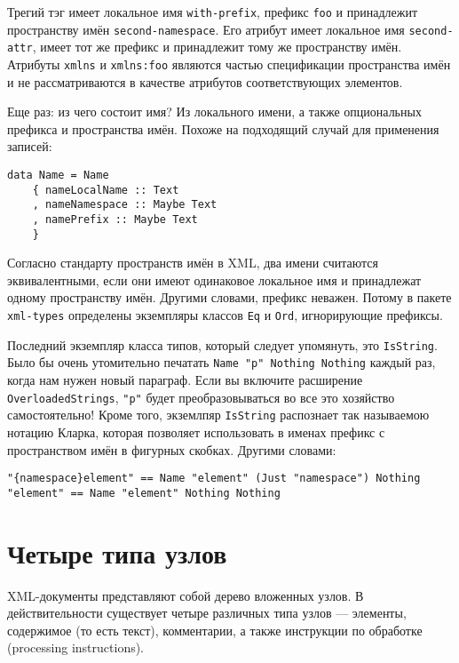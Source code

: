 Трегий тэг имеет локальное имя \lstinline!with-prefix!, префикс \lstinline!foo! и принадлежит пространству имён \lstinline!second-namespace!. Его атрибут имеет локальное имя \lstinline!second-attr!, имеет тот же префикс и принадлежит тому же пространству имён. Атрибуты \lstinline!xmlns! и \lstinline!xmlns:foo! являются частью спецификации пространства имён и не рассматриваются в качестве атрибутов соответствующих элементов.

Еще раз: из чего состоит имя? Из локального имени, а также опциональных префикса и пространства имён. Похоже на подходящий случай для применения записей:

\begin{lstlisting}
data Name = Name
    { nameLocalName :: Text
    , nameNamespace :: Maybe Text
    , namePrefix :: Maybe Text
    }
\end{lstlisting}

Согласно стандарту пространств имён в XML, два имени считаются эквивалентными, если они имеют одинаковое локальное имя и принадлежат одному пространству имён. Другими словами, префикс неважен. Потому в пакете \lstinline!xml-types! определены экземпляры классов \lstinline!Eq! и \lstinline!Ord!, игнорирующие префиксы.

Последний экземпляр класса типов, который следует упомянуть, это \lstinline!IsString!. Было бы очень утомительно печатать \lstinline!Name "p" Nothing Nothing! каждый раз, когда нам нужен новый параграф. Если вы включите расширение \lstinline!OverloadedStrings!, \lstinline!"p"! будет преобразовываться во все это хозяйство самостоятельно! Кроме того, экземлпяр \lstinline!IsString! распознает так называемою нотацию Кларка, которая позволяет использовать в именах префикс с пространством имён в фигурных скобках. Другими словами:

\begin{lstlisting}
"{namespace}element" == Name "element" (Just "namespace") Nothing
"element" == Name "element" Nothing Nothing
\end{lstlisting}

\section{Четыре типа узлов} %

XML-документы представляют собой дерево вложенных узлов. В действительности существует четыре различных типа узлов --- элементы, содержимое (то есть текст), комментарии, а также инструкции по обработке (processing instructions).

